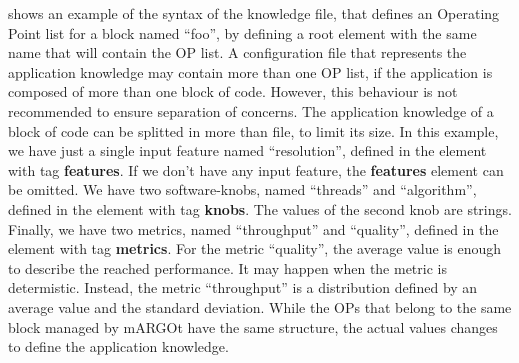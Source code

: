  shows an example of the syntax of the knowledge file, that defines an Operating Point list for a block named ``foo'', by defining a root element with the same name that will contain the OP list.
A configuration file that represents the application knowledge may contain more than one OP list, if the application is composed of more than one block of code.
However, this behaviour is not recommended to ensure separation of concerns.
The application knowledge of a block of code can be splitted in more than file, to limit its size.
In this example, we have just a single input feature named ``resolution'', defined in the element with tag \textbf{features}.
If we don't have any input feature, the \textbf{features} element can be omitted.
We have two software-knobs, named ``threads'' and ``algorithm'', defined in the element with tag \textbf{knobs}.
The values of the second knob are strings.
Finally, we have two metrics, named ``throughput'' and ``quality'', defined in the element with tag \textbf{metrics}.
For the metric ``quality'', the average value is enough to describe the reached performance.
It may happen when the metric is determistic.
Instead, the metric ``throughput'' is a distribution defined by an average value and the standard deviation.
While the OPs that belong to the same block managed by mARGOt have the same structure, the actual values changes to define the application knowledge.



